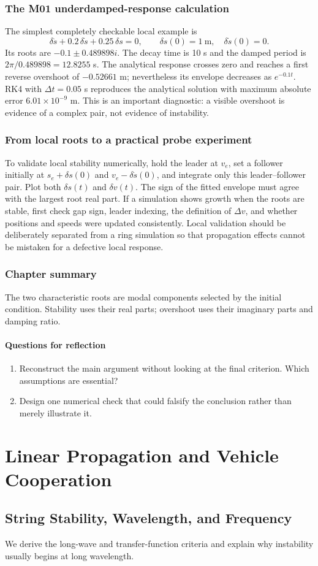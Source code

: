 \documentclass[11pt,a4paper,openany]{book}
\numberwithin{equation}{chapter}
\numberwithin{figure}{chapter}
\numberwithin{table}{chapter}
\newcommand{\chapterguide}[1]{\begin{tcolorbox}[keybox,title=Chapter guide]#1\end{tcolorbox}}
\newcommand{\chapterend}[1]{\section*{Chapter summary}\addcontentsline{toc}{section}{Chapter summary}\begin{tcolorbox}[resultbox]#1\end{tcolorbox}\subsection*{Questions for reflection}\begin{enumerate}[leftmargin=1.7em]\item Reconstruct the main argument without looking at the final criterion. Which assumptions are essential?\item Design one numerical check that could falsify the conclusion rather than merely illustrate it.\end{enumerate}\clearpage}
\begin{document}
\section{The M01 underdamped-response calculation}
The simplest completely checkable local example is
\begin{equation}
\delta\ddot s+0.2\,\delta\dot s+0.25\,\delta s=0,
\qquad \delta s(0)=1\ \mathrm m,\quad \delta\dot s(0)=0.
\end{equation}
Its roots are $-0.1\pm0.489898i$. The decay time is 10 s and the damped period is $2\pi/0.489898=12.8255$ s. The analytical response crosses zero and reaches a first reverse overshoot of $-0.52661$ m; nevertheless its envelope decreases as $e^{-0.1t}$. RK4 with $\Delta t=0.05$ s reproduces the analytical solution with maximum absolute error $6.01\times10^{-9}$ m. This is an important diagnostic: a visible overshoot is evidence of a complex pair, not evidence of instability.

\section{From local roots to a practical probe experiment}
To validate local stability numerically, hold the leader at $v_e$, set a follower initially at $s_e+\delta s(0)$ and $v_e-\delta\dot s(0)$, and integrate only this leader--follower pair. Plot both $\delta s(t)$ and $\delta v(t)$. The sign of the fitted envelope must agree with the largest root real part. If a simulation shows growth when the roots are stable, first check gap sign, leader indexing, the definition of $\Delta v$, and whether positions and speeds were updated consistently. Local validation should be deliberately separated from a ring simulation so that propagation effects cannot be mistaken for a defective local response.

\chapterend{The two characteristic roots are modal components selected by the initial condition. Stability uses their real parts; overshoot uses their imaginary parts and damping ratio.}

\part{Linear Propagation and Vehicle Cooperation}

\chapter{String Stability, Wavelength, and Frequency}
\chapterguide{We derive the long-wave and transfer-function criteria and explain why instability usually begins at long wavelength.}
\end{document}
